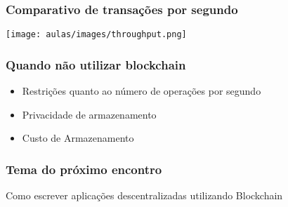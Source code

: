 \documentclass{beamer}
\begin{document}
\begin{frame}
\frametitle{Comparativo de transações por segundo}
\begin{center}
    \texttt{[image: aulas/images/throughput.png]}
\end{center}
\begin{footnotesize}
 [9]
\end{footnotesize}
\end{frame}



\begin{frame}
    \frametitle{Quando não utilizar blockchain}
    \begin{itemize}
        \item Restrições quanto ao número de operações por segundo
        \item Privacidade de armazenamento
        \item Custo de Armazenamento
    \end{itemize}
\end{frame}

\begin{frame}
 \frametitle{Tema do próximo encontro}
 \begin{center}
   Como escrever aplicações descentralizadas utilizando Blockchain
 \end{center}

\end{frame}
\end{document}
